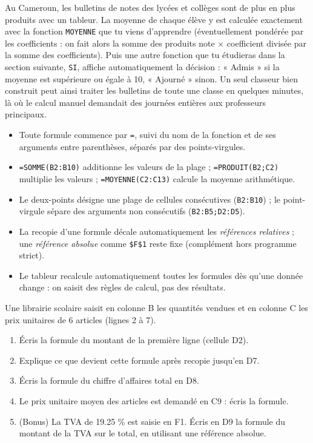 \documentclass[11pt]{article}
\begin{document}
\begin{savaistu}
Au Cameroun, les bulletins de notes des lycées et collèges sont de plus en plus produits avec un tableur. La moyenne de chaque élève y est calculée exactement avec la fonction \texttt{MOYENNE} que tu viens d'apprendre (éventuellement pondérée par les coefficients : on fait alors la somme des produits note $\times$ coefficient divisée par la somme des coefficients). Puis une autre fonction que tu étudieras dans la section suivante, \texttt{SI}, affiche automatiquement la décision : « Admis » si la moyenne est supérieure ou égale à 10, « Ajourné » sinon. Un seul classeur bien construit peut ainsi traiter les bulletins de toute une classe en quelques minutes, là où le calcul manuel demandait des journées entières aux professeurs principaux.
\end{savaistu}

\begin{aretenir}
\begin{itemize}
\item Toute formule commence par \texttt{=}, suivi du nom de la fonction et de ses arguments entre parenthèses, séparés par des points-virgules.
\item \texttt{=SOMME(B2:B10)} additionne les valeurs de la plage ; \texttt{=PRODUIT(B2;C2)} multiplie les valeurs ; \texttt{=MOYENNE(C2:C13)} calcule la moyenne arithmétique.
\item Le deux-points désigne une plage de cellules consécutives (\texttt{B2:B10}) ; le point-virgule sépare des arguments non consécutifs (\texttt{B2:B5;D2:D5}).
\item La recopie d'une formule décale automatiquement les \emph{références relatives} ; une \emph{référence absolue} comme \texttt{\$F\$1} reste fixe (complément hors programme strict).
\item Le tableur recalcule automatiquement toutes les formules dès qu'une donnée change : on saisit des règles de calcul, pas des résultats.
\end{itemize}
\end{aretenir}

\begin{exercice}
Une librairie scolaire saisit en colonne B les quantités vendues et en colonne C les prix unitaires de 6 articles (lignes 2 à 7).
\begin{enumerate}
\item Écris la formule du montant de la première ligne (cellule D2).
\item Explique ce que devient cette formule après recopie jusqu'en D7.
\item Écris la formule du chiffre d'affaires total en D8.
\item Le prix unitaire moyen des articles est demandé en C9 : écris la formule.
\item (Bonus) La TVA de \num{19,25} \% est saisie en F1. Écris en D9 la formule du montant de la TVA sur le total, en utilisant une référence absolue.
\end{enumerate}
\end{exercice}
\end{document}
